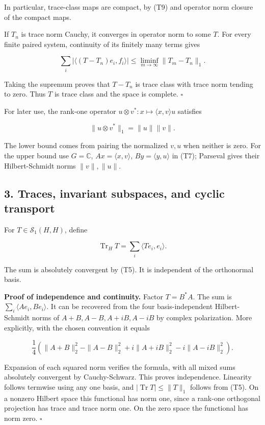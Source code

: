 \documentclass[
  11pt,
]{article}
\begin{document}
In particular, trace-class maps are compact, by (T9) and operator norm
closure of the compact maps.

If \(T_n\) is trace norm Cauchy, it converges in operator norm to some
\(T\). For every finite paired system, continuity of its finitely many
terms gives

\[
\sum_i|\langle (T-T_n)e_i,f_i\rangle|
\leq\liminf_{m\to\infty}\|T_m-T_n\|_1.
\]

Taking the supremum proves that \(T-T_n\) is trace class with trace norm
tending to zero. Thus \(T\) is trace class and the space is complete.
\(\square\)

For later use, the rank-one operator
\(u\otimes v^*:x\mapsto\langle x,v\rangle u\) satisfies

\[
\|u\otimes v^*\|_1=\|u\|\|v\|.                               \tag{T11}
\]

The lower bound comes from pairing the normalized \(v,u\) when neither
is zero. For the upper bound use \(G=\mathbb C\),
\(Ax=\langle x,v\rangle\), \(By=\langle y,u\rangle\) in (T7); Parseval
gives their Hilbert-Schmidt norms \(\|v\|,\|u\|\).

\subsection{3. Traces, invariant subspaces, and cyclic
transport}\label{traces-invariant-subspaces-and-cyclic-transport}

For \(T\in\mathcal S_1(H,H)\), define

\[
\operatorname{Tr}_H T=\sum_i\langle Te_i,e_i\rangle.           \tag{T12}
\]

The sum is absolutely convergent by (T5). It is independent of the
orthonormal basis.

\textbf{Proof of independence and continuity.} Factor \(T=B^*A\). The
sum is \(\sum_i\langle Ae_i,Be_i\rangle\). It can be recovered from the
four basis-independent Hilbert-Schmidt norms of \(A+B,A-B,A+iB,A-iB\) by
complex polarization. More explicitly, with the chosen convention it
equals

\[
\frac14\left(\|A+B\|_2^2-\|A-B\|_2^2
+i\|A+iB\|_2^2-i\|A-iB\|_2^2\right).
\]

Expansion of each squared norm verifies the formula, with all mixed sums
absolutely convergent by Cauchy-Schwarz. This proves independence.
Linearity follows termwise using any one basis, and
\(|\operatorname{Tr}T|\leq\|T\|_1\) follows from (T5). On a nonzero
Hilbert space this functional has norm one, since a rank-one orthogonal
projection has trace and trace norm one. On the zero space the
functional has norm zero. \(\square\)
\end{document}
